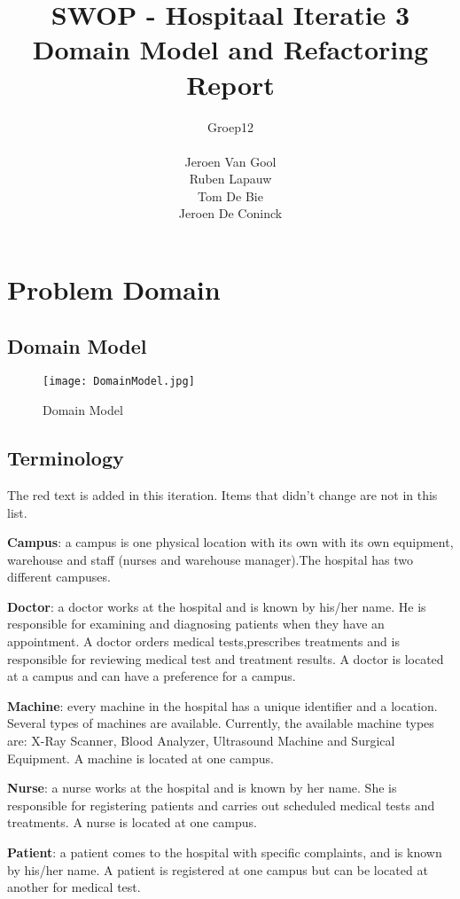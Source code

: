 \documentclass[a4paper]{article}
\title{SWOP - Hospitaal Iteratie 3\\Domain Model and Refactoring Report}
\author{Groep12\\ \\Jeroen Van Gool\\Ruben Lapauw\\Tom De Bie\\Jeroen De Coninck}
\date{}
\begin{document}
\maketitle
\newpage
\tableofcontents

\section{Problem Domain }

\subsection{Domain Model}

\begin{figure}[h]
\centering
\texttt{[image: DomainModel.jpg]}
\caption{Domain Model}
\label{fig:domain}
\end{figure}

\subsection{Terminology}

The red text is added in this iteration. Items that didn't change are not in this list.


{\color{red} \textbf{Campus}: a campus is one physical location with its own with its own equipment, warehouse and staff (nurses and warehouse manager).The hospital has two different campuses.}

\textbf{Doctor}: a doctor works at the hospital and is known by his/her name. He is responsible for examining and diagnosing patients when they have an appointment. A doctor orders medical tests,prescribes treatments and is responsible for reviewing medical test and treatment results.{\color{red} A doctor is located at a campus and can have a preference for a campus.}

\textbf{Machine}: every machine in the hospital has a unique identifier and a location. Several types of machines are available. Currently, the available machine types are: X-Ray Scanner, Blood Analyzer, Ultrasound Machine and Surgical Equipment.{\color{red} A machine is located at one campus.}

\textbf{Nurse}: a nurse works at the hospital and is known by her name. She is responsible for registering patients and carries out scheduled medical tests and treatments.{\color{red} A nurse is located at one campus.}

\textbf{Patient}: a patient comes to the hospital with specific complaints, and is known by his/her name.{\color{red} A patient is registered at one campus but can be located at another for medical test.}
\end{document}
